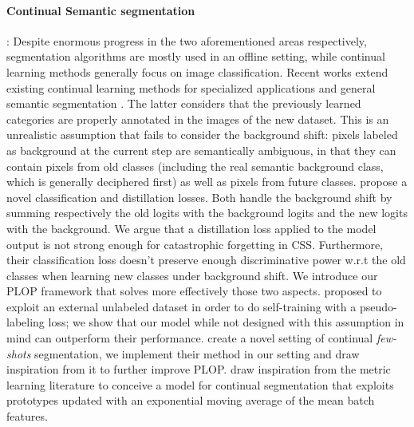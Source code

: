 \paragraph{Continual Semantic segmentation}: Despite enormous progress in the two
aforementioned areas respectively, segmentation algorithms are mostly used in an offline setting,
while continual learning methods generally focus on image classification. Recent works extend
existing continual learning methods \citep{li2018lwf,hou2019ucir} for specialized applications
\citep{ozdemir2018learnthenewkeeptheold,ozdemir2019segmentationanotomical,tasar19incrementsegmentationremotesensing}
and general semantic segmentation \citep{michieli2019ilt}. The latter considers that the previously
learned categories are properly annotated in the images of the new dataset. This is an unrealistic
assumption that fails to consider the background shift: pixels labeled as background at the current
step are semantically ambiguous, in that they can contain pixels from old classes (including the
real semantic background class, which is generally deciphered first) as well as pixels from future
classes. \cite{cermelli2020modelingthebackground} propose a novel classification and
distillation losses. Both handle the background shift by summing respectively the old logits with
the background logits and the new logits with the background. We argue that a distillation loss
applied to the model output is not strong enough for catastrophic forgetting in \ac{CSS}. Furthermore,
their classification loss doesn't preserve enough discriminative power w.r.t the old classes when
learning new classes under background shift. We introduce our PLOP framework that solves more
effectively those two aspects. \cite{yu2020continualsegmentationselftraining} proposed to
exploit an external unlabeled dataset in order to do self-training with a pseudo-labeling loss; we
show that our model while not designed with this assumption in mind can outperform their
performance. \cite{cermelli2020fewshotcontinualsegm} create a novel setting of
continual \textit{few-shots} segmentation, we implement their method in our setting and draw
inspiration from it to further improve PLOP. \cite{michieli2021sdr} draw
inspiration from the metric learning literature to conceive a model for continual segmentation that
exploits prototypes updated with an exponential moving average of the mean batch features.

